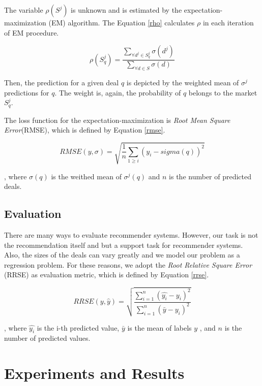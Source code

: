 \documentclass{acm_proc_article-sp}
\begin{document}
The variable $\rho(S^j)$ is unknown and is estimated by the  
expectation-maximization (EM) algorithm. The Equation \ref{rho} calculates $\rho$ 
in each iteration of EM procedure.

\begin{equation}
    \rho(S^j_q) = \frac{\sum_{\forall d^j \in S^j_q} \sigma(d^j)}{\sum_{\forall d \in S} \sigma(d)}
    \label{rho}
\end{equation}

Then, the prediction for a given deal $q$ is depicted by the weighted mean 
of $\sigma^j$ predictions for $q$. The weight is, again, the probability of $q$ 
belongs to the market $S^j_q$.

The loss function for the expectation-maximization is 
\emph{Root Mean Square Error}(RMSE), which is defined by Equation 
\ref{rmse}.

\begin{equation}
    RMSE(y,\sigma) = \sqrt{\frac{1}{n}\sum_{1\geq i}(y_i - sigma(q))^2}
    \label{rmse}
\end{equation}

, where $\sigma(q)$ is the weithed mean of $\sigma^j(q)$ and $n$ is the number 
of predicted deals.

\subsection{Evaluation}

There are many ways to evaluate recommender systems. However, our task 
is not the recommendation itself and but a support task for 
recommender systems. Also, the sizes of the deals can vary greatly and 
we model our problem as a regression problem.
For these reasons, we adopt the 
\emph{Root Relative Square Error} (RRSE)  as evaluation metric, which is 
defined by Equation \ref{rrse}. 

\begin{equation}
    RRSE(y,\hat{y}) = \sqrt{\frac{\sum_{i=1}^n (\hat{y_i}-y_i)^2}{\sum_{i=1}^n (\bar{y}-y_i)^2}}
    \label{rrse}
\end{equation}

, where $\hat{y_i}$ is the i-th predicted value, $\bar{y}$ is the mean of 
labels $y$ , and $n$ is the number of predicted values.

\section{Experiments and Results}
\end{document}
